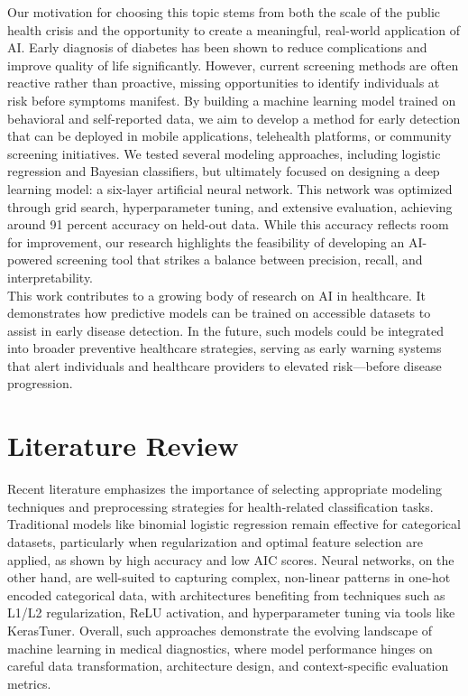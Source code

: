 \documentclass[conference]{IEEEtran}
\begin{document}
Our motivation for choosing this topic stems from both the scale of the public health crisis and the opportunity to create a meaningful, real-world application of AI. Early diagnosis of diabetes has been shown to reduce complications and improve quality of life significantly. However, current screening methods are often reactive rather than proactive, missing opportunities to identify individuals at risk before symptoms manifest. By building a machine learning model trained on behavioral and self-reported data, we aim to develop a method for early detection that can be deployed in mobile applications, telehealth platforms, or community screening initiatives.
We tested several modeling approaches, including logistic regression and Bayesian classifiers, but ultimately focused on designing a deep learning model: a six-layer artificial neural network. This network was optimized through grid search, hyperparameter tuning, and extensive evaluation, achieving around 91 percent accuracy on held-out data. While this accuracy reflects room for improvement, our research highlights the feasibility of developing an AI-powered screening tool that strikes a balance between precision, recall, and interpretability. \\

This work contributes to a growing body of research on AI in healthcare. It demonstrates how predictive models can be trained on accessible datasets to assist in early disease detection. In the future, such models could be integrated into broader preventive healthcare strategies, serving as early warning systems that alert individuals and healthcare providers to elevated risk—before disease progression. \\

\section{Literature Review}
Recent literature emphasizes the importance of selecting appropriate modeling techniques and preprocessing strategies for health-related classification tasks. Traditional models like binomial logistic regression remain effective for categorical datasets, particularly when regularization and optimal feature selection are applied, as shown by high accuracy and low AIC scores. Neural networks, on the other hand, are well-suited to capturing complex, non-linear patterns in one-hot encoded categorical data, with architectures benefiting from techniques such as L1/L2 regularization, ReLU activation, and hyperparameter tuning via tools like KerasTuner. Overall, such approaches demonstrate the evolving landscape of machine learning in medical diagnostics, where model performance hinges on careful data transformation, architecture design, and context-specific evaluation metrics.\\
\end{document}
